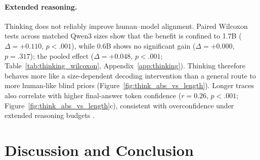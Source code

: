 \documentclass[letterpaper]{article}
\begin{document}

\paragraph{Extended reasoning.}
Thinking does not reliably improve human--model alignment.
Paired Wilcoxon tests across matched Qwen3 sizes show that the benefit is
confined to 1.7B ($\Delta{=}{+}0.110$, $p{<}.001$), while 0.6B shows no
significant gain ($\Delta{=}{+}0.000$, $p{=}.317$); the pooled effect
($\Delta{=}{+}0.048$, $p{<}.001$; Table~\ref{tab:thinking_wilcoxon},
Appendix~\ref{app:thinking}).
Thinking therefore behaves more like a size-dependent decoding intervention
than a general route to more human-like blind priors
(Figure~\ref{fig:think_abs_vs_length}).
Longer traces also correlate with higher final-answer token confidence
($r{=}0.26$, $p{<}.001$; Figure~\ref{fig:think_abs_vs_length}c),
consistent with overconfidence under extended reasoning budgets \citep{lacombe2025dontthink}.

\section{Discussion and Conclusion}
\label{sec:discussion}
\end{document}

